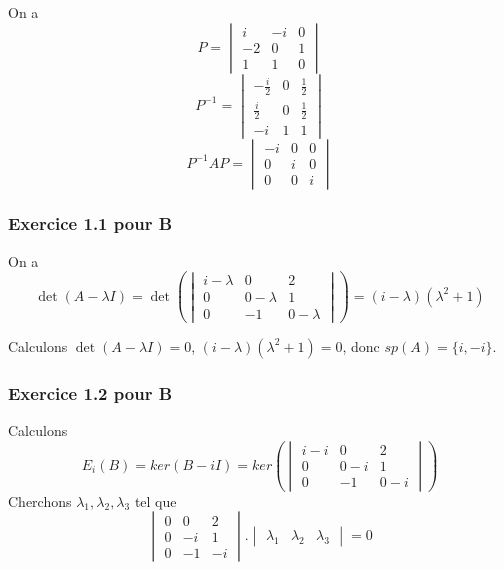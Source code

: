 \documentclass[]{book}
\theoremstyle{definition}
\begin{document}
On a 
$$P = \begin{vmatrix} i & -i & 0 \\ -2 & 0 & 1 \\ 1 & 1 & 0 \end{vmatrix}$$
$$P^{-1} = \begin{vmatrix} -\frac{i}{2} & 0 & \frac{1}{2} \\ \frac{i}{2} & 0 & \frac{1}{2} \\ -i & 1 & 1 \end{vmatrix}$$
$$P^{-1}AP = \begin{vmatrix} -i & 0 & 0 \\ 0 & i & 0 \\ 0 & 0 & i \end{vmatrix}$$



\subsubsection*{Exercice 1.1 pour B}
On a 
$$\det(A -\lambda I) = \det\left(\begin{vmatrix} i-\lambda & 0 & 2 \\ 0 & 0-\lambda & 1 \\ 0 & -1 & 0-\lambda \end{vmatrix}\right) = (i-\lambda)(\lambda^2+1)$$

Calculons $\det(A -\lambda I) = 0$, $(i-\lambda)(\lambda^2+1)=0$, donc $sp(A)=\{i, -i\}$. 

\subsubsection*{Exercice 1.2 pour B}
Calculons
$$E_{i}(B) = ker(B -iI) = ker\left(\begin{vmatrix} i-i & 0 & 2 \\ 0 & 0-i & 1 \\ 0 & -1 & 0-i \end{vmatrix}\right)$$
Cherchons $\lambda_1,\lambda_2,\lambda_3$  tel que
$$\begin{vmatrix} 0 & 0 & 2 \\ 0 & -i & 1 \\ 0 & -1 & -i \end{vmatrix}.\begin{vmatrix} \lambda_1 & \lambda_2 & \lambda_3 \end{vmatrix} = 0$$
\end{document}
